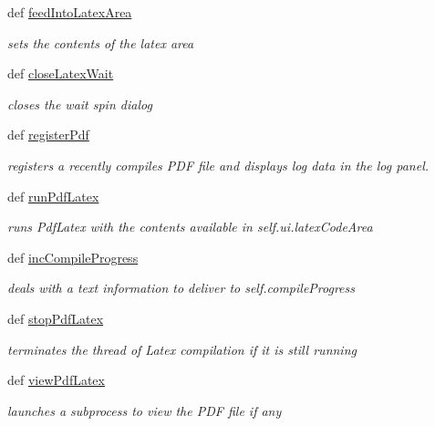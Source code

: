 \begin{DoxyCompactItemize}
def \hyperlink{classuicilibris_1_1w2mMainWindow_ada098421fc13a62937c011086ce8f70a}{feed\-Into\-Latex\-Area}
\begin{DoxyCompactList}\small\item\em sets the contents of the latex area \end{DoxyCompactList}\item 
def \hyperlink{classuicilibris_1_1w2mMainWindow_afc484d21355b4e2bd6f729f6cdfcf5a0}{close\-Latex\-Wait}
\begin{DoxyCompactList}\small\item\em closes the wait spin dialog \end{DoxyCompactList}\item 
def \hyperlink{classuicilibris_1_1w2mMainWindow_a4f2c62dae7e6c1085fd0f210c53257f4}{register\-Pdf}
\begin{DoxyCompactList}\small\item\em registers a recently compiles \-P\-D\-F file and displays log data in the log panel. \end{DoxyCompactList}\item 
def \hyperlink{classuicilibris_1_1w2mMainWindow_a3cfde91f57684cbb7bf7e54a3fecbeba}{run\-Pdf\-Latex}
\begin{DoxyCompactList}\small\item\em runs \-Pdf\-Latex with the contents available in self.\-ui.\-latex\-Code\-Area \end{DoxyCompactList}\item 
def \hyperlink{classuicilibris_1_1w2mMainWindow_a832d79edba89eabe0de87a3341bb9707}{inc\-Compile\-Progress}
\begin{DoxyCompactList}\small\item\em deals with a text information to deliver to self.\-compile\-Progress \end{DoxyCompactList}\item 
def \hyperlink{classuicilibris_1_1w2mMainWindow_abbbadefbe280076540bf281798cc2869}{stop\-Pdf\-Latex}
\begin{DoxyCompactList}\small\item\em terminates the thread of \-Latex compilation if it is still running \end{DoxyCompactList}\item 
def \hyperlink{classuicilibris_1_1w2mMainWindow_ab7460cd2f26720e6a131093d56bcc68a}{view\-Pdf\-Latex}
\begin{DoxyCompactList}\small\item\em launches a subprocess to view the \-P\-D\-F file if any \end{DoxyCompactList}\item 

\end{DoxyCompactItemize}
